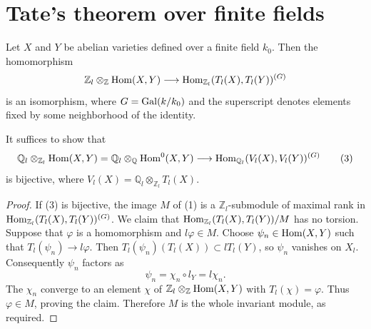 
\section{Tate's theorem over finite fields}
\label{mumford-appendix-I-source}

\begin{theorem}[Tate]
\label{mumford-thm-tate-hom-finite-field}
\label{mumford-thm-tate-hom-isomorphism}
Let $X$ and $Y$ be abelian varieties defined over a finite field $k_0$. Then
the homomorphism
\[
 \mathbb Z_l\otimes_{\mathbb Z}{\rm Hom}(X,Y)\longrightarrow
 {\rm Hom}_{\mathbb Z_l}(T_l(X),T_l(Y))^{(G)}
\]
is an isomorphism, where $G={\rm Gal}(k/k_0)$ and the superscript denotes
elements fixed by some neighborhood of the identity.
\end{theorem}

\begin{proposition}[Step I]
\label{mumford-appI-step-I}
It suffices to show that
\[
 \mathbb Q_l\otimes_{\mathbb Z_l}{\rm Hom}(X,Y)
 =\mathbb Q_l\otimes_{\mathbb Q}{\rm Hom}^{0}(X,Y)
 \longrightarrow {\rm Hom}_{\mathbb Q_l}(V_l(X),V_l(Y))^{(G)} \tag{3}
\]
is bijective, where $V_l(X)=\mathbb Q_l\otimes_{\mathbb Z_l}T_l(X)$.
\end{proposition}
\begin{proof}
If (3) is bijective, the image $M$ of (1) is a $\mathbb Z_l$-submodule of
maximal rank in ${\rm Hom}_{\mathbb Z_l}(T_l(X),T_l(Y))^{(G)}$. We claim that
${\rm Hom}_{\mathbb Z_l}(T_l(X),T_l(Y))/M$ has no torsion. Suppose that
$\varphi$ is a homomorphism and $l\varphi\in M$. Choose
$\psi_n\in {\rm Hom}(X,Y)$ such that $T_l(\psi_n)\to l\varphi$.
Then $T_l(\psi_n)(T_l(X))\subset lT_l(Y)$, so $\psi_n$ vanishes on $X_l$.
Consequently $\psi_n$ factors as
\[
 \psi_n=\chi_n\circ l_Y=l\chi_n.
\]
The $\chi_n$ converge to an element $\chi$ of
$\mathbb Z_l\otimes_{\mathbb Z}{\rm Hom}(X,Y)$ with $T_l(\chi)=\varphi$.
Thus $\varphi\in M$, proving the claim. Therefore $M$ is the whole invariant
module, as required.

\end{proof}



